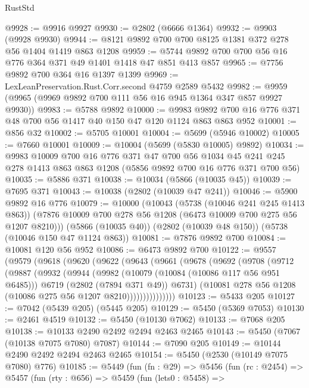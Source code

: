 \begin{lexlean}{RustStd}
\begin{coremodule}
@9928 := @9916 @9927
@9930 := @2802 (@6666 @1364)
@9932 := @9903 (@9928 @9930)
@9944 := @8121 @9892 @700 @700 @8125 @1381 @372 @278 @56 @1404 @1419 @863 @1208
@9959 := @5744 @9892 @700 @700 @56 @16 @776 @364 @371 @49 @1401 @1418 @47 @851 @413 @857
@9965 := @7756 @9892 @700 @364 @16 @1397 @1399
@9969 := LexLeanPreservation.Rust.Corr.second @4759 @2589 @5432
@9982 := @9959 (@9965 (@9969 @9892 @700 @111 @56 @16 @945 @1364 @347 @857 @9927 @9930))
@9983 := @5788 @9892
@10000 := @9983 @9892 @700 @16 @776 @371 @48 @700 @56 @1417 @40 @150 @47 @120 @1124 @863 @863 @952
@10001 := @856 @32
@10002 := @5705 @10001
@10004 := @5699 (@5946 @10002)
@10005 := @7660 @10001
@10009 := @10004 (@5699 (@5830 @10005) @9892)
@10034 := @9983
    @10009
    @700
    @16
    @776
    @371
    @47
    @700
    @56
    @1034
    @45
    @241
    @245
    @278
    @1413
    @863
    @863
    @1208
    (@5856 @9892 @700 @16 @776 @371 @700 @56)
@10035 := @5886 @371
@10038 := @10034 (@5866 (@10035 @45))
@10039 := @7695 @371
@10043 := @10038 (@2802 (@10039 @47 @241))
@10046 := @5900 @9892 @16 @776
@10079 := @10000
    (@10043
      (@5738 (@10046 @241 @245 @1413 @863))
      (@7876 @10009 @700 @278 @56 @1208 (@6473 @10009 @700 @275 @56 @1207 @8210)))
    (@5866 (@10035 @40))
    (@2802 (@10039 @48 @150))
    (@5738 (@10046 @150 @47 @1124 @863))
@10081 := @7876 @9892 @700
@10084 := @10081 @120 @56 @952
@10086 := @6473 @9892 @700
@10122 := @9557
    (@9579
      (@9618
        (@9620
          (@9622
            (@9643
              (@9661
                (@9678
                  (@9692
                    (@9708
                      (@9712
                        (@9887
                          (@9932
                            (@9944
                              (@9982
                                (@10079 (@10084 (@10086 @117 @56 @951 @6485)))
                                @6719
                                (@2802 (@7894 @371 @49))
                                @6731)
                              (@10081 @278 @56 @1208 (@10086 @275 @56 @1207 @8210)))))))))))))))
@10123 := @5433 @205
@10127 := @7042 (@5439 @205) (@5445 @205)
@10129 := @5450 (@5369 @7053)
@10130 := @2461 @4519
@10132 := @5450 (@10130 @7062)
@10133 := @7068 @205
@10138 := @10133 @2490 @2492 @2494 @2463 @2465
@10143 := @5450 (@7067 (@10138 @7075 @7080) @7087)
@10144 := @7090 @205
@10149 := @10144 @2490 @2492 @2494 @2463 @2465
@10154 := @5450 (@2530 (@10149 @7075 @7080) @776)
@10185 := @5449
    (fun (fn : @29) =>
    @5456
      (fun (rc : @2454) =>
      @5457
        (fun (rty : @656) =>
        @5459
          (fun (lets0 : @5458) =>

\end{coremodule}
\end{lexlean}
